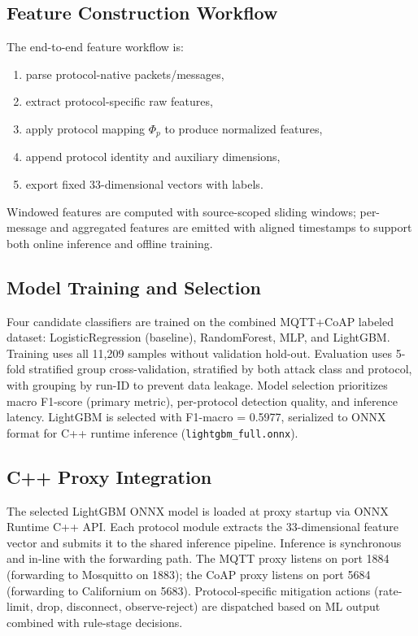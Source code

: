 \documentclass[conference]{IEEEtran}
\begin{document}
\subsection{Feature Construction Workflow}
The end-to-end feature workflow is:
\begin{enumerate}
\item parse protocol-native packets/messages,
\item extract protocol-specific raw features,
\item apply protocol mapping $\Phi_p$ to produce normalized features,
\item append protocol identity and auxiliary dimensions,
\item export fixed 33-dimensional vectors with labels.
\end{enumerate}
Windowed features are computed with source-scoped sliding windows; per-message and aggregated features are emitted with aligned timestamps to support both online inference and offline training.

\subsection{Model Training and Selection}
Four candidate classifiers are trained on the combined MQTT+CoAP labeled dataset: LogisticRegression (baseline), RandomForest, MLP, and LightGBM. Training uses all 11,209 samples without validation hold-out. Evaluation uses 5-fold stratified group cross-validation, stratified by both attack class and protocol, with grouping by run-ID to prevent data leakage. Model selection prioritizes macro F1-score (primary metric), per-protocol detection quality, and inference latency. LightGBM is selected with F1-macro = 0.5977, serialized to ONNX format for C++ runtime inference (\texttt{lightgbm\_full.onnx}).

\subsection{C++ Proxy Integration}
The selected LightGBM ONNX model is loaded at proxy startup via ONNX Runtime C++ API. Each protocol module extracts the 33-dimensional feature vector and submits it to the shared inference pipeline. Inference is synchronous and in-line with the forwarding path. The MQTT proxy listens on port 1884 (forwarding to Mosquitto on 1883); the CoAP proxy listens on port 5684 (forwarding to Californium on 5683). Protocol-specific mitigation actions (rate-limit, drop, disconnect, observe-reject) are dispatched based on ML output combined with rule-stage decisions.
\end{document}
